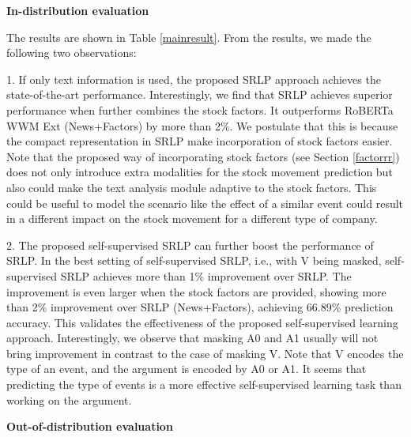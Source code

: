 \documentclass{article}
\begin{document}
\noindent \textbf{In-distribution evaluation} 

 The results are shown in Table  \ref{mainresult}. From the results, we made the following two observations:

1. If only text information is used, the proposed SRLP approach achieves the state-of-the-art performance. Interestingly, we find that SRLP achieves superior performance when further combines the stock factors. It outperforms RoBERTa WWM Ext (News+Factors) by more than 2\%. We postulate that this is because the compact representation in SRLP make incorporation of stock factors easier. Note that the proposed way of incorporating stock factors (see Section \ref{factorrr}) does not only introduce extra modalities for the stock movement prediction but also could make the text analysis module adaptive to the stock factors. This could be useful to model the scenario like the effect of a similar event could result in a different impact on the stock movement for a different type of company.\par
2. The proposed self-supervised SRLP can further boost the performance of SRLP. In the best setting of self-supervised SRLP, i.e., with V being masked, self-supervised SRLP achieves more than 1\% improvement over SRLP.  The improvement is even larger when the stock factors are provided, showing more than 2\% improvement over SRLP (News+Factors), achieving 66.89\% prediction accuracy. This validates the effectiveness of the proposed self-supervised learning approach. Interestingly, we observe that masking A0 and A1 usually will not bring improvement in contrast to the case of masking V. Note that V encodes the type of an event, and the argument is encoded by A0 or A1. It seems that predicting the type of events is a more effective self-supervised learning task than working on the argument.































\noindent \textbf{Out-of-distribution evaluation}
\end{document}
